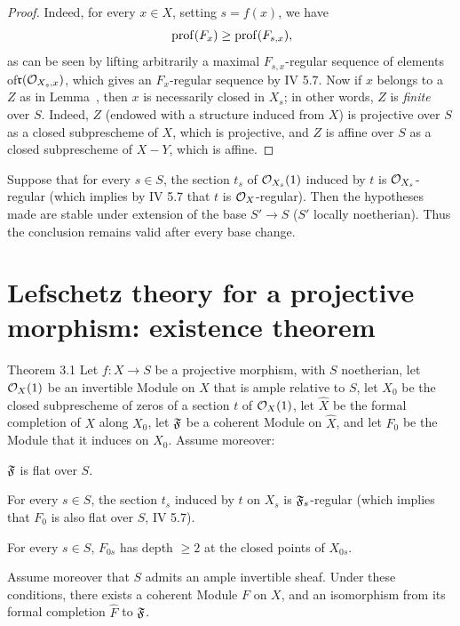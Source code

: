 \begin{proof}
Indeed, for every $x\in X$, setting $s=f(x)$, we have
\steco
\begin{equation} \label{eq:XII.16} {}\operatorname{prof}(F_x)\geq \operatorname{prof}(F_{s, x}),
\end{equation}
as can be seen by lifting arbitrarily a maximal $F_{s, x}$-regular sequence of elements of\pageoriginale $\mathfrak{r}(\mathcal O_{X_s, x})$, which gives an $F_x$-regular sequence by  IV 5.7. Now if $x$ belongs to a $Z$ as in Lemma~, then $x$ is necessarily closed in $X_s$; in other words, $Z$ is \emph{finite} over $S$. Indeed, $Z$ (endowed with a structure induced from $X$) is projective over $S$ as a closed subprescheme of $X$, which is projective, and $Z$ is affine over $S$ as a closed subprescheme of $X- Y$, which is affine.
\skipqed
\end{proof}

\begin{remarque} \label{XII.2.6}
Suppose that for every $s\in S$, the section $t_s$ of $\mathcal O_{X_s}(1)$ induced by $t$ is $\mathcal O_{X_s}$-regular (which implies by  IV 5.7 that $t$ is $\mathcal O_X$-regular). Then the hypotheses made are stable under extension of the base $S'\to S$ ($S'$ locally noetherian). Thus the conclusion remains valid after every base change.
\end{remarque}

\section[Lefschetz theory for a projective morphism: existence]{Lefschetz theory for a projective morphism: existence theorem}\label{XII.3}%

\setcounter{equation}{16}%
\label{XII.3.1}%
\begin{enonce*}{Theorem 3.1}
Let $f:X\to S$ be a projective morphism, with $S$ noetherian, let $\mathcal O_X(1)$ be an invertible Module on $X$ that is ample relative to $S$, let $X_0$ be the closed subprescheme of zeros of a section $t$ of $\mathcal O_X(1)$, let $\widehat{X}$ be the formal completion of $X$ along $X_0$, let $\mathfrak F$ be a coherent Module on $\widehat{X}$, and let $F_0$ be the Module that it induces on $X_0$. Assume moreover:
\begin{enumeratea}
\item\label{XII.3.1a}
$\mathfrak F$ is flat over $S$.
\item\label{XII.3.1b}
For every $s\in S$, the section $t_s$ induced by $t$ on $X_s$ is $\mathfrak F_s$-regular (which implies that $F_0$ is also flat over $S$, \cf \textup{ IV 5.7}).
\item\label{XII.3.1c}
For every $s\in S$, $F_{0s}$ has depth $\geq 2$ at the closed points of $X_{0s}$.
\end{enumeratea}
Assume moreover that $S$ admits an ample invertible sheaf. Under these conditions, there exists a coherent Module $F$ on $X$, and an isomorphism from its formal completion $\widehat{F}$ to $\mathfrak F$.
\end{enonce*}

